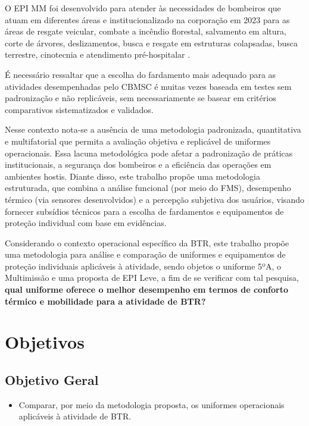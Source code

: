 		O \acrshort{EPI} \acrlong{MM} foi desenvolvido para atender às necessidades de bombeiros que atuam 
		em diferentes áreas e institucionalizado na corporação em 2023 para as áreas de resgate 
		veicular, combate a incêndio florestal, salvamento em altura, corte de árvores, 
		deslizamentos, busca e resgate em estruturas colapsadas, busca terrestre, cinotecnia 
		e atendimento pré-hospitalar \cite{res16}. 
		
		É necessário ressaltar que a escolha do fardamento mais adequado para as atividades desempenhadas pelo
		\acrshort{CBMSC} é muitas vezes baseada em testes sem padronização e não replicáveis, sem 
		necessariamente se basear em critérios comparativos sistematizados e validados.

		Nesse contexto nota-se a ausência de uma metodologia padronizada, quantitativa e multifatorial que 
		permita a avaliação objetiva e replicável de uniformes operacionais. Essa lacuna metodológica 
		pode afetar a padronização de práticas institucionais, a segurança dos bombeiros e a eficiência 
		das operações em ambientes hostis. Diante disso, este trabalho propõe uma metodologia estruturada, 
		que combina a análise funcional (por meio do \acrfull{FMS}), desempenho térmico (via sensores 
		desenvolvidos) e a percepção subjetiva dos usuários, visando fornecer subsídios técnicos para 
		a escolha de fardamentos e equipamentos de proteção individual com base em evidências.

		Considerando o contexto operacional específico da \acrlong{BTR}, este trabalho propõe uma metodologia 
		para análise e comparação de uniformes e equipamentos de proteção individuais aplicáveis à 
		atividade, sendo objetos o uniforme 5ºA, o Multimissão e uma proposta de \acrshort{EPI} Leve, 
		a fim de se verificar com tal pesquisa, \textbf{qual uniforme oferece o melhor desempenho 
	 	em termos de conforto térmico e mobilidade para a atividade de \acrlong{BTR}?}

	\section{Objetivos}

		\subsection{Objetivo Geral}
			\begin{itemize}
				\item Comparar, por meio da metodologia proposta, os uniformes operacionais 
				aplicáveis à atividade de \acrlong{BTR}.
			\end{itemize}
